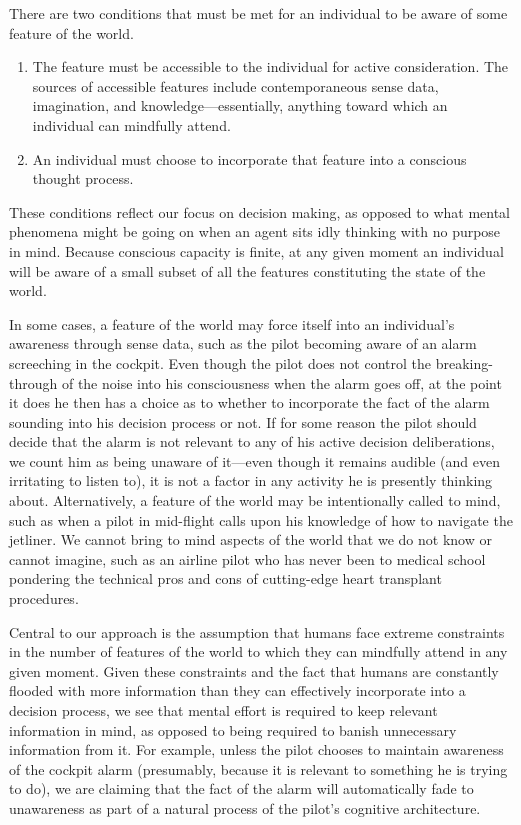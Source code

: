 \documentclass[
11pt,
titlepage,
reqno,
]{article}%
\theoremstyle{definition}
\begin{document}
There are two conditions that must be met for an individual to be aware of some feature of the world. 
\begin{enumerate}
	\item The feature must be accessible to the individual for active consideration. The sources of accessible features include contemporaneous sense data, imagination, and knowledge---essentially, anything toward which an individual can mindfully attend.
	\item An individual must choose to incorporate that feature into a conscious thought process.
\end{enumerate}
These conditions reflect our focus on decision making, as opposed to what mental phenomena might be going on when an agent sits idly thinking with no purpose in mind. 
Because conscious capacity is finite, at any given moment an individual will be aware of a small subset of all the features constituting the state of the world.

In some cases, a feature of the world may force itself into an individual's awareness through sense data, such as the pilot becoming aware of an alarm screeching in the cockpit.
Even though the pilot does not control the breaking-through of the noise into his consciousness when the alarm goes off, at the point it does he then has a choice as to whether to incorporate the fact of the alarm sounding into his decision process or not.
If for some reason the pilot should decide that the alarm is not relevant to any of his active decision deliberations, we count him as being unaware of it---even though it remains audible (and even irritating to listen to), it is not a factor in any activity he is presently thinking about.
Alternatively, a feature of the world may be intentionally called to mind, such as when a pilot in mid-flight calls upon his knowledge of how to navigate the jetliner. 
We cannot bring to mind aspects of the world that we do not know or cannot imagine, such as an airline pilot who has never been to medical school pondering the technical pros and cons of cutting-edge heart transplant procedures. 

Central to our approach is the assumption that humans face extreme constraints in the number of features of the world to which they can mindfully attend in any given moment.
Given these constraints and the fact that humans are constantly flooded with more information than they can effectively incorporate into a decision process, we see that mental effort is required to keep relevant information in mind, as opposed to being required to banish unnecessary information from it.
For example, unless the pilot chooses to maintain awareness of the cockpit alarm (presumably, because it is relevant to something he is trying to do), we are claiming that the fact of the alarm will automatically fade to unawareness as part of a natural process of the pilot's  cognitive architecture. 
\end{document}
